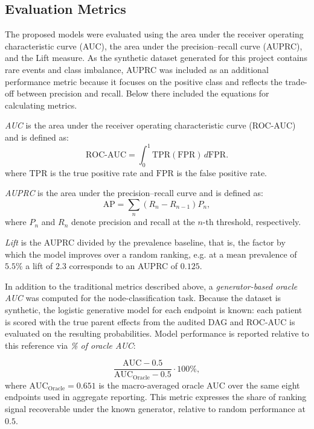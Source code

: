 \subsection{Evaluation Metrics}
\label{subsubsec:metrics}

The proposed models were evaluated using the area under the receiver operating
characteristic curve (AUC), the area under the precision--recall curve (AUPRC),
and the Lift measure. As the synthetic dataset generated for this project contains
rare events and class imbalance, AUPRC was included as an additional performance
metric because it focuses on the positive class and reflects the trade-off
between precision and recall. Below there included the equations for calculating metrics.

\emph{AUC} is the area under the receiver operating characteristic curve (ROC-AUC) 
and is defined as:
\begin{equation}
  \mathrm{ROC\mbox{-}AUC}
  =
  \int_0^1 \mathrm{TPR}(\mathrm{FPR})\,d\mathrm{FPR}.
  \end{equation}
  where $\mathrm{TPR}$ is the true positive rate and $\mathrm{FPR}$ is the false positive rate.

\emph{AUPRC} is the area under the precision--recall curve and is defined as:
\begin{equation}
  \mathrm{AP} =
  \sum_{n}
  \left(R_n - R_{n-1}\right) P_n,
  \end{equation}
  where $P_n$ and $R_n$ denote precision and recall at the $n$-th threshold,
  respectively.

\emph{Lift} is the AUPRC divided by the prevalence baseline, that is, the
factor by which the model improves over a random ranking, e.g. at a mean
prevalence of $5.5\%$ a lift of $2.3$ corresponds to an AUPRC of $0.125$.

In addition to the traditional metrics described above, a
\emph{generator-based oracle AUC} was computed for the node-classification
task. Because the dataset is synthetic, the logistic generative model for
each endpoint is known: each patient is scored with the true parent effects
from the audited DAG and ROC-AUC is evaluated on the resulting
probabilities. Model performance is reported relative to this reference via
\emph{\% of oracle AUC}:

\begin{equation}
  \frac{\mathrm{AUC} - 0.5}{\mathrm{AUC}_{\mathrm{Oracle}} - 0.5} \cdot 100\%,
  \label{eq:pct-ceiling}
\end{equation}
%
where $\mathrm{AUC}_{\mathrm{Oracle}} = 0.651$ is the macro-averaged oracle
AUC over the same eight endpoints used in aggregate reporting. This metric
expresses the share of ranking signal recoverable under the known generator,
relative to random performance at $0.5$.


